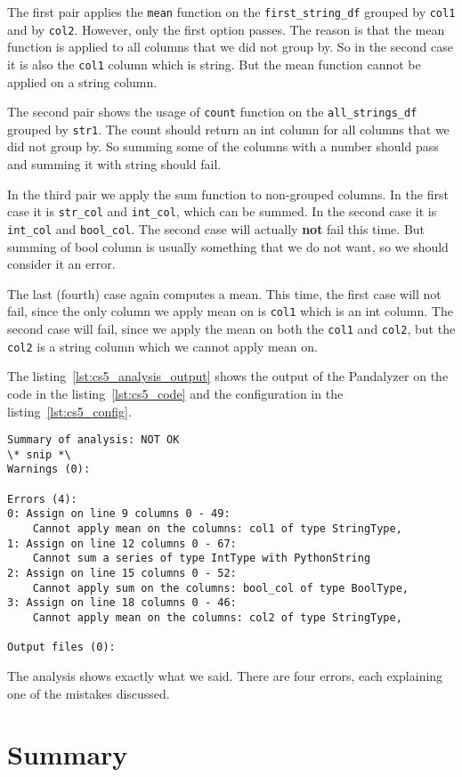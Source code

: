 The first pair applies the \verb|mean| function on the \verb|first_string_df| grouped by \verb|col1| and by \verb|col2|.
However, only the first option passes.
The reason is that the mean function is applied to all columns that we did not group by.
So in the second case it is also the \verb|col1| column which is string.
But the mean function cannot be applied on a string column.

The second pair shows the usage of \verb|count| function on the \verb|all_strings_df| grouped by \verb|str1|.
The count should return an int column for all columns that we did not group by.
So summing some of the columns with a number should pass and summing it with string should fail.

In the third pair we apply the sum function to non-grouped columns.
In the first case it is \verb|str_col| and \verb|int_col|, which can be summed.
In the second case it is \verb|int_col| and \verb|bool_col|.
The second case will actually \textbf{not} fail this time.
But summing of bool column is usually something that we do not want, so we should consider it an error.

The last (fourth) case again computes a mean.
This time, the first case will not fail, since the only column we apply mean on is \verb|col1| which is an int column.
The second case will fail, since we apply the mean on both the \verb|col1| and \verb|col2|, but the \verb|col2| is
a string column which we cannot apply mean on.

The listing~\ref{lst:cs5_analysis_output} shows the output of the Pandalyzer on the code in the listing~\ref{lst:cs5_code}
and the configuration in the listing~\ref{lst:cs5_config}.

\begin{lstlisting}[caption=Analysis output of the fifth case study, label={lst:cs5_analysis_output}, captionpos=b]
Summary of analysis: NOT OK
\* snip *\
Warnings (0):

Errors (4):
0: Assign on line 9 columns 0 - 49:
    Cannot apply mean on the columns: col1 of type StringType,
1: Assign on line 12 columns 0 - 67:
    Cannot sum a series of type IntType with PythonString
2: Assign on line 15 columns 0 - 52:
    Cannot apply sum on the columns: bool_col of type BoolType,
3: Assign on line 18 columns 0 - 46:
    Cannot apply mean on the columns: col2 of type StringType,

Output files (0):
\end{lstlisting}

The analysis shows exactly what we said.
There are four errors, each explaining one of the mistakes discussed.

\section*{Summary}
